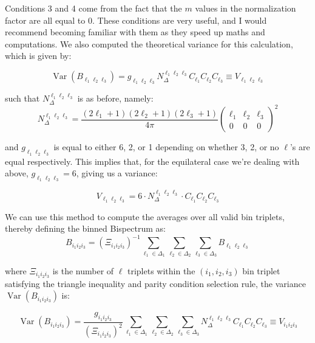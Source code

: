 \documentclass[11pt]{article}
\renewcommand{\_}[1]{\underline{ #1 }}
\newcommand{\npar}{\vspace{.3cm}\newline}
\begin{document}
{Conditions 3 and 4 come from the fact that the $m$ values in the normalization factor are all equal to $0$. These conditions are very useful, and I would recommend becoming familiar with them as they speed up maths and computations.
\npar
We also computed the theoretical variance for this calculation, which is given by:

\begin{equation}
    \operatorname{Var}\left(B_{\ell_{1} \ell_{2} \ell_{3}}\right)=g_{\ell_{1} \ell_{2} \ell_{3}} N_{\Delta}^{\ell_{1} \ell_{2} \ell_{3}} C_{\ell_{1}} C_{\ell_{2}} C_{\ell_{3}} \equiv V_{\ell_{1} \ell_{2} \ell_{3}}
\end{equation}

such that $N_{\Delta}^{\ell_1 \ell_2 \ell_3}$ is as before, namely:
\begin{equation}
    N_{\Delta}^{\ell_1\ell_2\ell_3} = \frac{(2\ell_1+1)(2\ell_2+1)(2\ell_3+1)}{4\pi} \begin{pmatrix}
        \ell_1 & \ell_2 & \ell_3 \\
        0 & 0 & 0
    \end{pmatrix}^2
\end{equation}

and $g_{\ell_1 \ell_2 \ell_3}$ is equal to either 6, 2, or 1 depending on whether 3, 2, or no $\ell$'s are equal respectively. This implies that, for the equilateral case we're dealing with above, $g_{\ell_1 \ell_2 \ell_3} = 6$, giving us a variance:

\begin{equation}
    V_{\ell_1 \ell_2 \ell_3} = 6 \cdot N_{\Delta}^{\ell_1 \ell_2 \ell_3} \cdot C_{\ell_1} C_{\ell_2} C_{\ell_3}
\end{equation}

We can use this method to compute the averages over all valid bin triplets, thereby defining the binned Bispectrum as:
\begin{equation}
    B_{i_1 i_2 i_3} = (\Xi_{i_1 i_2 i_3})^{-1} \sum_{\ell_1\in\Delta_1}\sum_{\ell_2\in\Delta_2}\sum_{\ell_3\in\Delta_3} B_{\ell_1 \ell_2 \ell_3}
\end{equation}

where $\Xi_{i_1 i_2 i_3}$ is the number of $\ell$ triplets within the $(i_1,i_2,i_3)$ bin triplet satisfying the triangle inequality and parity condition selection rule, the variance $\operatorname{Var} (B_{i_1 i_2 i_3})$ is:

\begin{equation}
    \operatorname{Var} (B_{i_1 i_2 i_3}) = \frac{g_{i_1 i_2 i_3}}{(\Xi_{i_1 i_2 i_3})^2} \sum_{\ell_1\in\Delta_1}\sum_{\ell_2\in\Delta_2}\sum_{\ell_3\in\Delta_3} N_{\Delta}^{\ell_1 \ell_2 \ell_3} C_{\ell_1} C_{\ell_2} C_{\ell_3} \equiv V_{i_1 i_2 i_3}
\end{equation}

}
\end{document}
